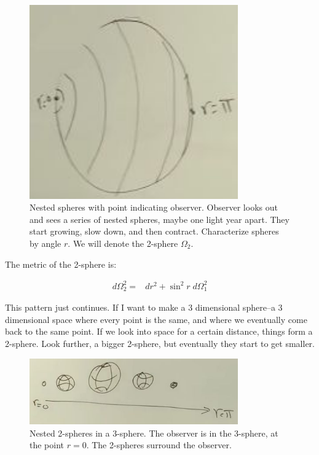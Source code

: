 \documentclass[]{article}
\begin{document}
\begin{figure}[H]
	\caption[Nested spheres with point indicating observer]{Nested spheres with point indicating observer. Observer looks out and sees a series of nested spheres, maybe one light year apart. They start growing, slow down, and then contract. Characterize spheres by angle $r$. We will denote the 2-sphere $\Omega_2$.} 
	\includegraphics[width=0.8\textwidth]{cosmo-3-1-nested-spheres}
\end{figure}

The metric of the 2-sphere is:

\begin{align*}
	d\Omega_2^2 =& dr^2 + \sin^2 r\; d\Omega_1^2
\end{align*}

This pattern just continues. If I want to make a 3 dimensional sphere--a 3 dimensional space where every point is the same, and where we eventually come back to the same point. If we look into space for a certain distance, things form a 2-sphere. Look further, a bigger 2-sphere, but eventually they start to get smaller.

\begin{figure}[H]
	\caption[Nested 2-spheres in a 3-sphere]{Nested 2-spheres in a 3-sphere. The observer is in the 3-sphere, at the point $r=0$. The 2-spheres surround the observer.}
	\includegraphics[width=0.8\textwidth]{cosmo-3-3-sphere}
\end{figure}
\end{document}
